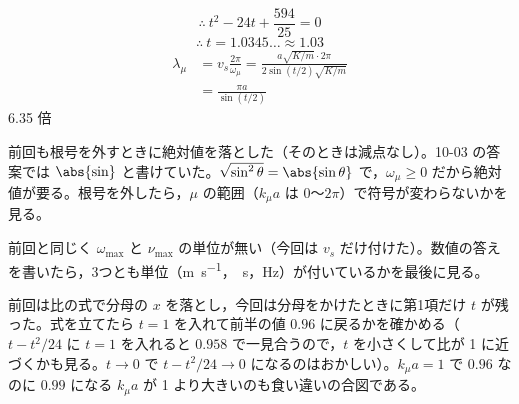 \[ \therefore\ t^{2}-24t+\frac{594}{25}=0 \]
\[ \therefore\ t=1.0345\ldots\approx1.03 \]
\begin{align*}
  \lambda_\mu&=v_s\frac{2\pi}{\omega_\mu}=\frac{a\sqrt{K/m}\cdot2\pi}{2\sin(t/2)\sqrt{K/m}}\\
  &=\frac{\pi a}{\sin(t/2)}
\end{align*}
6.35 倍
\item {} 前回も根号を外すときに絶対値を落とした（そのときは減点なし）。10-03 の答案では $\abs{\sin}$ と書けていた。$\sqrt{\sin^{2}\theta}=\abs{\sin\theta}$ で，$\omega_\mu\ge0$ だから絶対値が要る。根号を外したら，$\mu$ の範囲（$k_\mu a$ は $0$〜$2\pi$）で符号が変わらないかを見る。
\item {} 前回と同じく $\omega_{\max}$ と $\nu_{\max}$ の単位が無い（今回は $v_s$ だけ付けた）。数値の答えを書いたら，3つとも単位（\unit{\metre\per\second}，\unit{\per\second}，\unit{\hertz}）が付いているかを最後に見る。
\item {} 前回は比の式で分母の $x$ を落とし，今回は分母をかけたときに第1項だけ $t$ が残った。式を立てたら $t=1$ を入れて前半の値 $0.96$ に戻るかを確かめる（$t-t^{2}/24$ に $t=1$ を入れると $0.958$ で一見合うので，$t$ を小さくして比が 1 に近づくかも見る。$t\to0$ で $t-t^{2}/24\to0$ になるのはおかしい）。$k_\mu a=1$ で $0.96$ なのに $0.99$ になる $k_\mu a$ が 1 より大きいのも食い違いの合図である。
